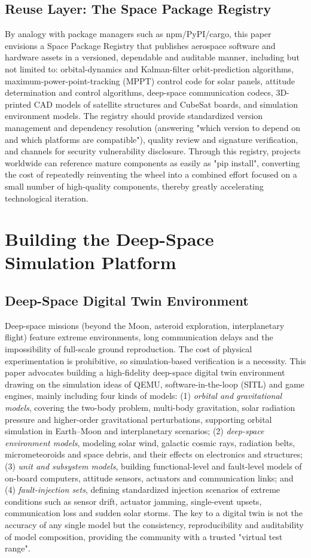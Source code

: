 \documentclass[11pt]{article}
\begin{document}
\subsection{Reuse Layer: The Space Package Registry}
By analogy with package managers such as npm/PyPI/cargo, this paper envisions a Space Package Registry that publishes aerospace software and hardware assets in a versioned, dependable and auditable manner, including but not limited to: orbital-dynamics and Kalman-filter orbit-prediction algorithms, maximum-power-point-tracking (MPPT) control code for solar panels, attitude determination and control algorithms, deep-space communication codecs, 3D-printed CAD models of satellite structures and CubeSat boards, and simulation environment models. The registry should provide standardized version management and dependency resolution (answering "which version to depend on and which platforms are compatible"), quality review and signature verification, and channels for security vulnerability disclosure. Through this registry, projects worldwide can reference mature components as easily as "pip install", converting the cost of repeatedly reinventing the wheel into a combined effort focused on a small number of high-quality components, thereby greatly accelerating technological iteration.

\section{Building the Deep-Space Simulation Platform}
\subsection{Deep-Space Digital Twin Environment}
Deep-space missions (beyond the Moon, asteroid exploration, interplanetary flight) feature extreme environments, long communication delays and the impossibility of full-scale ground reproduction. The cost of physical experimentation is prohibitive, so simulation-based verification is a necessity. This paper advocates building a high-fidelity deep-space digital twin environment drawing on the simulation ideas of QEMU, software-in-the-loop (SITL) and game engines, mainly including four kinds of models: (1) \emph{orbital and gravitational models}, covering the two-body problem, multi-body gravitation, solar radiation pressure and higher-order gravitational perturbations, supporting orbital simulation in Earth--Moon and interplanetary scenarios; (2) \emph{deep-space environment models}, modeling solar wind, galactic cosmic rays, radiation belts, micrometeoroids and space debris, and their effects on electronics and structures; (3) \emph{unit and subsystem models}, building functional-level and fault-level models of on-board computers, attitude sensors, actuators and communication links; and (4) \emph{fault-injection sets}, defining standardized injection scenarios of extreme conditions such as sensor drift, actuator jamming, single-event upsets, communication loss and sudden solar storms. The key to a digital twin is not the accuracy of any single model but the consistency, reproducibility and auditability of model composition, providing the community with a trusted "virtual test range".
\end{document}
